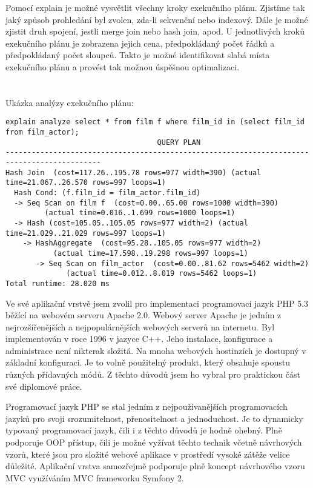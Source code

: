 \documentclass[12pt]{article}
\begin{document}
Pomocí explain je možné vysvětlit všechny kroky exekučního plánu. Zjistíme tak jaký způsob prohledání byl zvolen, zda-li sekvenční nebo indexový. Dále je možné zjistit druh spojení, jestli merge join nebo hash join, apod. U jednotlivých kroků exekučního plánu je zobrazena jejich cena, předpokládaný počet řádků a předpokládaný počet sloupců. Takto je možné identifikovat slabá místa exekučního plánu a provést tak možnou úspěšnou optimalizaci.\\
\\
\\ Ukázka analýzy exekučního plánu:
\begin{scriptsize}
\begin{verbatim}
explain analyze select * from film f where film_id in (select film_id from film_actor);
                                   QUERY PLAN
--------------------------------------------------------------------------------------------
Hash Join  (cost=117.26..195.78 rows=977 width=390) (actual time=21.067..26.570 rows=997 loops=1)
  Hash Cond: (f.film_id = film_actor.film_id)
  -> Seq Scan on film f  (cost=0.00..65.00 rows=1000 width=390) 
  	     (actual time=0.016..1.699 rows=1000 loops=1)
  -> Hash (cost=105.05..105.05 rows=977 width=2) (actual time=21.029..21.029 rows=997 loops=1)
    -> HashAggregate  (cost=95.28..105.05 rows=977 width=2) 
           (actual time=17.598..19.298 rows=997 loops=1)
       -> Seq Scan on film_actor  (cost=0.00..81.62 rows=5462 width=2) 
              (actual time=0.012..8.019 rows=5462 loops=1)
Total runtime: 28.020 ms
\end{verbatim}
\end{scriptsize}


Ve své aplikační vrstvě jsem zvolil pro implementaci programovací jazyk PHP 5.3 běžící na webovém serveru Apache 2.0. Webový server Apache je jedním z nejrozšířenějších a nejpopulárnějších webových serverů na internetu. Byl implementován v roce 1996 v jazyce C++. Jeho instalace, konfigurace a administrace není nikterak složitá. Na mnoha webových hostinzích je dostupný v základní konfiguraci. Je to volně použitelný produkt, který obsahuje spoustu různých přídavných módů. Z těchto důvodů jsem ho vybral pro praktickou část své diplomové práce.

Programovací jazyk PHP se stal jedním z nejpoužívanějších programovacích jazyků pro svoji srozumitelnost, přenositelnost a jednoduchost. Je to dynamicky typovaný programovací jazyk, čili i z těchto důvodů je hodně ohebný. Plně podporuje OOP přístup, čili je možné vyžívat těchto technik včetně návrhových vzorů, které jsou pro složité webové aplikace v prostředí vysoké zátěže velice důležité. Aplikační vrstva samozřejmě podporuje plně koncept návrhového vzoru MVC využíváním MVC frameworku Symfony 2.
\end{document}
